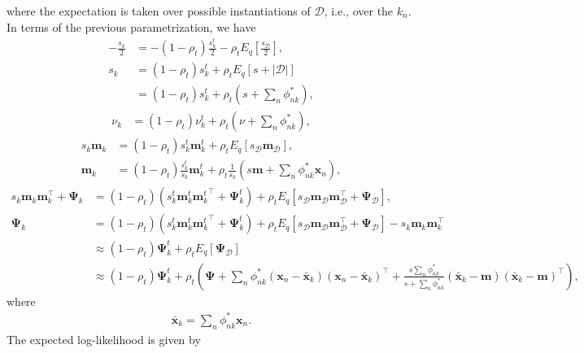 \documentclass[a4paper]{article}
\begin{document}
			where the expectation is taken over possible instantiations of $\mathcal{D}$, i.e., over the $k_n$.
			In terms of the previous parametrization, we have
			\begin{align}
				-\frac{s_k}{2} &= -(1 - \rho_t) \frac{s_k^t}{2} - \rho_t E_q\left[\frac{s_\mathcal{D}}{2}\right], \\
				s_k &= (1 - \rho_t) s_k^t + \rho_t E_q\left[s + |\mathcal{D}|\right] \\
				&= (1 - \rho_t) s_k^t + \rho_t \left( s + \sum_n \phi^*_{nk} \right),
			\end{align}
			\begin{align}
				\nu_k &= (1 - \rho_t) \nu_k^t + \rho_t \left( \nu + \sum_n \phi^*_{nk} \right),
			\end{align}
			\begin{align}
				s_k \mathbf{m}_k &= (1 - \rho_t) s_k^t \mathbf{m}_k^t + \rho_t E_q[s_\mathcal{D} \mathbf{m}_\mathcal{D}], \\
				\mathbf{m}_k &= (1 - \rho_t) \frac{s_k^t}{s_k} \mathbf{m}_k^t + \rho_t \frac{1}{s_k} \left( s \mathbf{m} + \sum_n \phi_{nk}^* \mathbf{x}_n \right),
			\end{align}
			\begin{align}
				s_k \mathbf{m}_k\mathbf{m}_k^\top + \bm{\Psi}_k
				&= (1 - \rho_t) \left( s_k^t \mathbf{m}_k^t{\mathbf{m}_k^t}^\top + \bm{\Psi}_k^t \right) + \rho_t E_q\left[ s_\mathcal{D} \mathbf{m}_\mathcal{D}\mathbf{m}_\mathcal{D}^\top + \bm{\Psi}_\mathcal{D} \right], \\
				\bm{\Psi}_k
				&= (1 - \rho_t) \left( s_k^t \mathbf{m}_k^t{\mathbf{m}_k^t}^\top + \bm{\Psi}_k^t \right) + \rho_t E_q\left[ s_\mathcal{D} \mathbf{m}_\mathcal{D}\mathbf{m}_\mathcal{D}^\top + \bm{\Psi}_\mathcal{D} \right]
				- s_k \mathbf{m}_k\mathbf{m}_k^\top \\
				&\approx (1 - \rho_t) \bm{\Psi}_k^t + \rho_t E_q\left[ \bm{\Psi}_\mathcal{D} \right] \\
				&\approx (1 - \rho_t) \bm{\Psi}_k^t + \rho_t \left( \bm{\Psi} + \sum_n \phi_{nk}^* (\mathbf{x}_n - \mathbf{\bar x}_k) (\mathbf{x}_n - \mathbf{\bar x}_k)^\top
					+ \frac{s \sum_n \phi_{nk}^*}{s + \sum_n \phi_{nk}^*} (\mathbf{\bar x}_k - \mathbf{m}) (\mathbf{\bar x}_k - \mathbf{m})^\top \right),
			\end{align}
			where
			\begin{align}
				\mathbf{\bar x}_k = \sum_n \phi_{nk}^* \mathbf{x}_n.
			\end{align}
			The expected log-likelihood is given by
\end{document}
